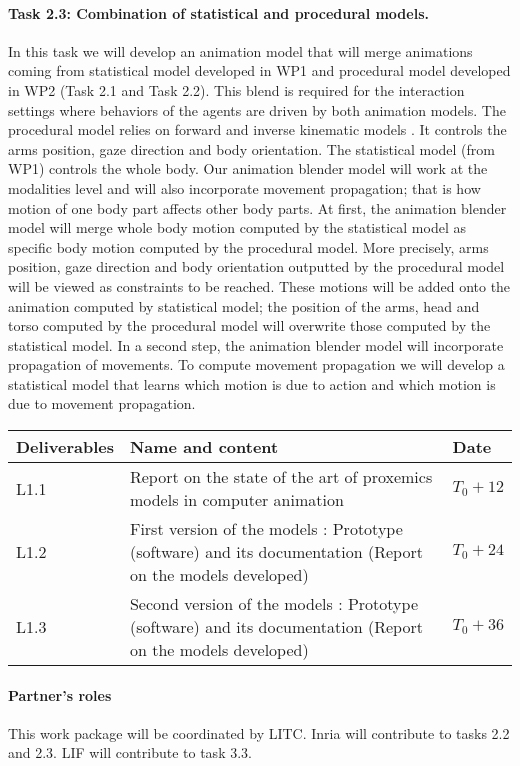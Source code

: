 \paragraph{Task 2.3:  Combination of statistical and procedural models.}

In this task we will develop an animation model that will merge animations coming from statistical model developed in WP1 and procedural model developed in WP2 (Task 2.1 and Task 2.2). This blend is required for the interaction settings where behaviors of the agents are driven by both animation models.  The procedural model relies on forward and inverse kinematic models \cite{huang:2012:EET}. It controls the arms position, gaze direction and body orientation. The statistical model (from WP1) controls the whole body.  Our animation blender model will work at the modalities level and will also incorporate movement propagation; that is how motion of one body part affects other body parts. At first, the animation blender model will merge whole body motion computed by the statistical model as specific body motion computed by the procedural model. More precisely, arms position, gaze direction and body orientation outputted by the procedural model will be viewed as constraints to be reached. These motions will be added onto the animation computed by statistical model; the position of the arms, head and torso computed by the procedural model will overwrite those computed by the statistical model. In a second step, the animation blender model will incorporate propagation of movements. To compute movement propagation we will develop a statistical model that learns which motion is due to action and which motion is due to movement propagation.

\vspace{5mm}

\begin{tabular}{|l|p{10cm}|l|}\hline
Deliverables & Name and content  & Date  \\\hline
L1.1  & Report on the state of the art of proxemics models in computer animation&   $T_0+12$  \\\hline
L1.2  &  First version of the models : Prototype (software) and its documentation (Report on the models developed) & $T_0+24$ \\\hline
L1.3  &  Second version of the models : Prototype (software) and its documentation (Report on the models developed) &  $T_0+36$ \\\hline
\end{tabular}

\paragraph{Partner's roles} This work package  will be coordinated by LITC. Inria  will contribute to tasks 2.2 and 2.3. LIF will contribute to task 3.3.
 
\endinput
